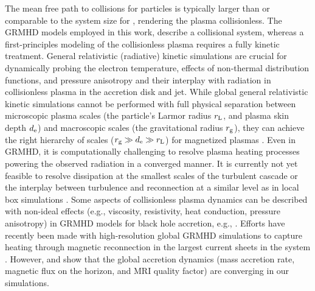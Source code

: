 {The mean free path to collisions for particles is typically larger than or comparable to the system size for \sgra, rendering the plasma collisionless. The GRMHD models employed in this work, describe a collisional system, whereas a first-principles modeling of the collisionless plasma requires a fully kinetic treatment. General relativistic (radiative) kinetic simulations are crucial for dynamically probing the electron temperature, effects of non-thermal distribution functions, and pressure anisotropy and their interplay with radiation in collisionless plasma in the accretion disk and jet. While global general relativistic kinetic simulations cannot be performed with full physical separation between microscopic plasma scales (the particle's Larmor radius $r_{\rm L}$, and plasma skin depth $d_{\rm e}$) and macroscopic scales (the gravitational radius $r_{\rm g}$), they can achieve the right hierarchy of scales ($r_{\rm g} \gg d_{\rm e} \gg r_{\rm L}$) for magnetized plasmas \citep{2018A&A...616A.184L,2018ApJ...863L..31C,2019PhRvL.122c5101P,2020PhRvL.124n5101C,2020ApJ...895..121C,2020ApJ...902...80K,2021A&A...650A.163C,2021PhRvL.127e5101B}. Even in GRMHD, it is computationally challenging to resolve plasma heating processes powering the observed radiation in a converged manner. It is currently not yet feasible to resolve dissipation at the smallest scales of the turbulent cascade or the interplay between turbulence and reconnection at a similar level as in local box simulations \citep{2012ApJ...755...50R,2013ApJ...773..118H,2015PhRvL.114f1101H,2016PhRvL.117w5101K,2017PhRvL.118e5103Z,2018PhRvL.121y5101C,2018ApJ...859..149I,2019PhRvL.122e5101Z,2021ApJ...921...87N,2021arXiv211108188C}. Some aspects of collisionless plasma dynamics can be described with non-ideal effects (e.g., viscosity, resistivity, heat conduction, pressure anisotropy) in GRMHD models for black hole accretion, e.g.,  \cite{2014MNRAS.440L..41B,2015ApJ...810..162C,2016MNRAS.456.1332F,2017ApJ...837...92C,2017MNRAS.470.2240F,2018ApJ...859...28Q,2019ApJS..244...10R,2019ApJ...882....2V,2020ApJ...900..100R,2021PhRvD.104j3028M,2021arXiv211103689N,2021arXiv211105752M}. Efforts have recently been made with high-resolution global GRMHD simulations to capture heating through magnetic reconnection in the largest current sheets in the system \citep{2020MNRAS.495.1549N,2020ApJ...900..100R,2021MNRAS.508.1241C,2021arXiv210915115R,2021arXiv211103689N}. However, \citet{2019ApJS..243...26P} and \citet[in prep.]{Olivares_et_al} show that the global accretion dynamics (mass accretion rate, magnetic flux on the horizon, and MRI quality factor) are converging in our simulations.}

